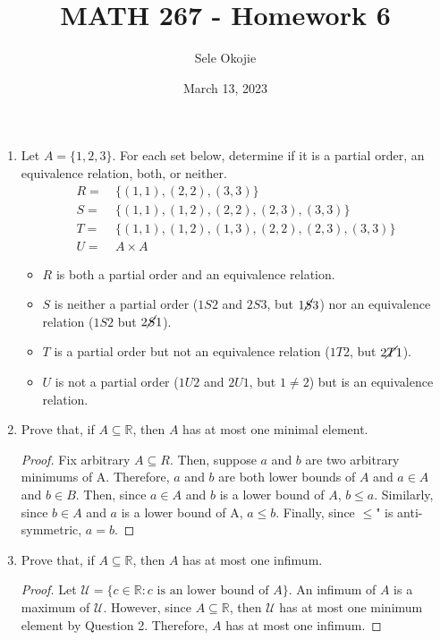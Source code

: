 \documentclass{article}
\title{MATH 267 - Homework 6}
\author{Sele Okojie}
\date{March 13, 2023}
\begin{document}
    \maketitle

    \begin{enumerate}
    
        \item Let $A = \{ 1, 2, 3 \}$.  For each set below, determine if it is a partial order, an equivalence relation, both, or neither.
    	\begin{align*}
    		R = & \ \{ (1, 1), (2, 2), (3, 3) \} \\
    		S = & \ \{ (1, 1), (1, 2), (2, 2), (2, 3), (3, 3) \} \\
    		T = & \ \{ (1, 1), (1, 2), (1, 3), (2, 2), (2, 3), (3, 3) \} \\
    		U = & \ A \times A
    	\end{align*}

            \begin{itemize}
                \item $R$ is both a partial order and an equivalence relation.
                 \item $S$ is neither a partial order ($1 S 2$ and $2 S 3$, but $1 \cancel{S} 3$) nor an equivalence relation ($1 S 2$ but $2 \cancel{S} 1$).
                \item $T$ is a partial order but not an equivalence relation ($1 T 2$, but $2 \cancel{T} 1$).
                \item $U$ is not a partial order ($1 U 2$ and $2 U 1$, but $1 \neq 2$) but is an equivalence relation.
            \end{itemize}
            
        \item Prove that, if $A \subseteq \mathbb{R}$, then $A$ has at most one minimal element.
            \begin{proof}
                Fix arbitrary $A \subseteq R$. Then, suppose $a$ and $b$ are two arbitrary minimums of A. Therefore, $a$ and $b$ are both lower bounds of $A$ and $a \in A$ and $b \in B$. Then, since $a \in A$ and $b$ is a lower bound of $A$, $b \le a$. Similarly, since $b \in A$ and $a$ is a lower bound of A, $a \le b$. Finally, since \lQuote$\le$" is anti-symmetric, $a = b$. 
            \end{proof}

        \item Prove that, if $A \subseteq \mathbb{R}$, then $A$ has at most one infimum.
            \begin{proof}
                Let $\mathcal{U} = \{ c \in \mathbb{R} : c \text{ is an lower bound of }A \}$. An infimum of $A$ is a maximum of $\mathcal{U}$. However, since $A \subseteq \mathbb{R}$, then $\mathcal{U}$ has at most one minimum element by Question 2. Therefore, $A$ has at most one infimum. 
            \end{proof}


\end{enumerate}
\end{document}

